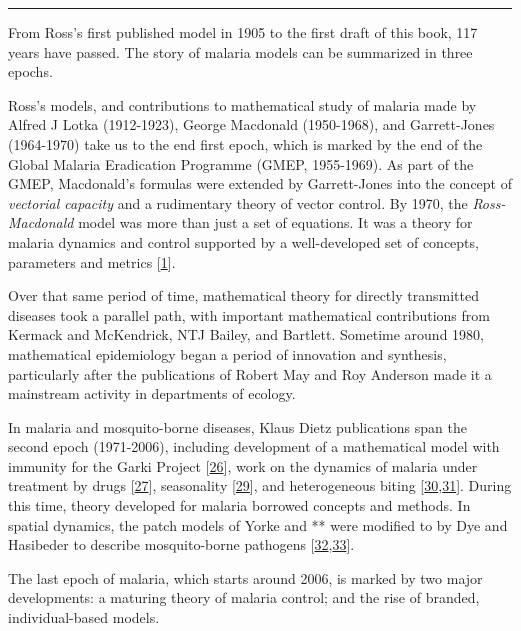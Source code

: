 \documentclass[
]{book}
\begin{document}
\begin{center}\rule{0.5\linewidth}{0.5pt}\end{center}

From Ross's first published model in 1905 to the first draft of this book, 117 years have passed. The story of malaria models can be summarized in three epochs.

Ross's models, and contributions to mathematical study of malaria made by Alfred J Lotka (1912-1923), George Macdonald (1950-1968), and Garrett-Jones (1964-1970) take us to the end first epoch, which is marked by the end of the Global Malaria Eradication Programme (GMEP, 1955-1969). As part of the GMEP, Macdonald's formulas were extended by Garrett-Jones into the concept of \emph{vectorial capacity} and a rudimentary theory of vector control. By 1970, the \emph{Ross-Macdonald} model was more than just a set of equations. It was a theory for malaria dynamics and control supported by a well-developed set of concepts, parameters and metrics {[}\protect\hyperlink{ref-SmithDL2012_RossMacdonald}{1}{]}.

Over that same period of time, mathematical theory for directly transmitted diseases took a parallel path, with important mathematical contributions from Kermack and McKendrick, NTJ Bailey, and Bartlett. Sometime around 1980, mathematical epidemiology began a period of innovation and synthesis, particularly after the publications of Robert May and Roy Anderson made it a mainstream activity in departments of ecology.

In malaria and mosquito-borne diseases, Klaus Dietz publications span the second epoch (1971-2006), including development of a mathematical model with immunity for the Garki Project {[}\protect\hyperlink{ref-DietzK1974MalariaModel}{26}{]}, work on the dynamics of malaria under treatment by drugs {[}\protect\hyperlink{ref-DietzK1975ModelsParasitic}{27}{]}, seasonality {[}\protect\hyperlink{ref-DietzK1976IncidenceInfectious}{29}{]}, and heterogeneous biting {[}\protect\hyperlink{ref-DietzK1980ModelsVectorborne}{30},\protect\hyperlink{ref-DietzK1988EpidemiologicalModels}{31}{]}. During this time, theory developed for malaria borrowed concepts and methods. In spatial dynamics, the patch models of Yorke and ** were modified to by Dye and Hasibeder to describe mosquito-borne pathogens {[}\protect\hyperlink{ref-DyeC1986PopulationDynamics}{32},\protect\hyperlink{ref-HasibederG1988PopulationDynamics}{33}{]}.

The last epoch of malaria, which starts around 2006, is marked by two major developments: a maturing theory of malaria control; and the rise of branded, individual-based models.
\end{document}
